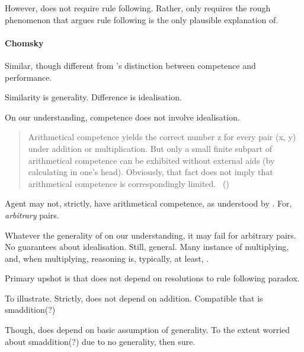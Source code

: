 \begin{note}
  However, \sR{} does not require rule following.
  Rather, \sR{} only requires the rough phenomenon that \citeauthor{Boghossian:2008vf} argues rule following is the only plausible explanation of.
\end{note}


\paragraph{Chomsky}

\begin{note}
  Similar, though different from \citeauthor{Chomsky:2015aa}'s distinction between competence and performance.

  Similarity is generality.
  Difference is idealisation.

  On our understanding, competence does not involve idealisation.

  \begin{quote}
    Arithmetical competence yields the correct number z for every pair (x, y) under addition or multiplication.
    But only a small finite subpart of arithmetical competence can be exhibited without external aids (by calculating in one's head).
    Obviously, that fact does not imply that arithmetical competence is correspondingly limited.\newline
    \mbox{ }\hfill\mbox{(\citeyear[xii]{Chomsky:2015aa})}
  \end{quote}

  Agent may not, strictly, have arithmetical competence, as understood by \citeauthor{Chomsky:2015aa}.
  For, \emph{arbitrary} pairs.

  Whatever the generality of  on our understanding, it may fail for arbitrary pairs.
  No guarantees about idealisation.
  Still, general.
  Many instance of multiplying, and, when multiplying, reasoning is, typically, at least, \sR{}.
\end{note}

\begin{note}
  Primary upshot is that \sR{} does not depend on resolutions to rule following paradox.

  To illustrate.
  Strictly, \sR{} does not depend on addition.
  Compatible that \sR{} is smaddition(?)

  Though, does depend on basic assumption of generality.
  To the extent worried about smaddition(?) due to no generality, then sure.
\end{note}

